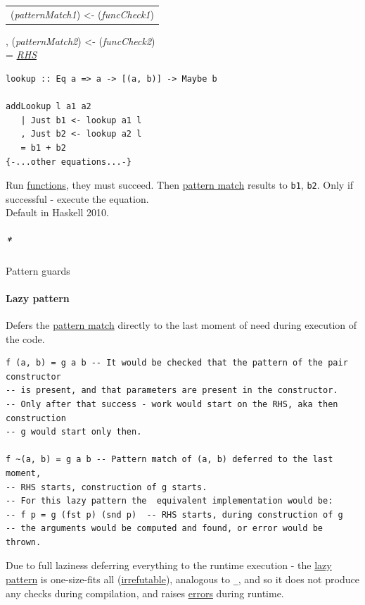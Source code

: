 \documentclass[11pt]{article}
\begin{document}
\begin{center}
\begin{tabular}{l}
(\emph{patternMatch1}) <- (\emph{funcCheck1})\\
\end{tabular}
\end{center}
, (\emph{patternMatch2}) <- (\emph{funcCheck2})\\
= \emph{\hyperref[org88f5d62]{RHS}}\\

\begin{verbatim}
lookup :: Eq a => a -> [(a, b)] -> Maybe b

addLookup l a1 a2
   | Just b1 <- lookup a1 l
   , Just b2 <- lookup a2 l
   = b1 + b2
{-...other equations...-}
\end{verbatim}
Run \hyperref[orgaa8fb87]{functions}, they must succeed. Then \hyperref[org8d84a1a]{pattern match} results to \texttt{b1}, \texttt{b2}. Only if successful - execute the equation.\\

Default in Haskell 2010.\\

\subparagraph{\emph{*}}
\label{sec:orgd07ede6}

\label{orgddac959}Pattern guards\\

\paragraph{\label{org618e055}Lazy pattern}
\label{sec:org8206dc1}
Defers the \hyperref[org8d84a1a]{pattern match} directly to the last moment of need during execution of the code.\\

\begin{verbatim}
f (a, b) = g a b -- It would be checked that the pattern of the pair constructor
-- is present, and that parameters are present in the constructor.
-- Only after that success - work would start on the RHS, aka then construction
-- g would start only then.

f ~(a, b) = g a b -- Pattern match of (a, b) deferred to the last moment,
-- RHS starts, construction of g starts.
-- For this lazy pattern the  equivalent implementation would be:
-- f p = g (fst p) (snd p)  -- RHS starts, during construction of g
-- the arguments would be computed and found, or error would be thrown.
\end{verbatim}

Due to full laziness deferring everything to the runtime execution - the \hyperref[org618e055]{lazy pattern} is one-size-fits all (\hyperref[org5f9dad8]{irrefutable}), analogous to \texttt{\_}, and so it does not produce any checks during compilation, and raises \hyperref[org544dbf6]{errors} during runtime.\\
\end{document}
